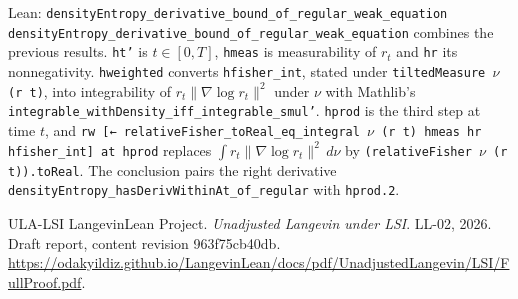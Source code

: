 \documentclass[11pt,a4paper]{article}
\begin{document}
\begin{leanbox}{Lean: \texttt{densityEntropy\_\allowbreak{}derivative\_\allowbreak{}bound\_\allowbreak{}of\_\allowbreak{}regular\_\allowbreak{}weak\_\allowbreak{}equation}}
\texttt{density\allowbreak{}Entropy\_\allowbreak{}derivative\_\allowbreak{}bound\_\allowbreak{}of\_\allowbreak{}regular\_\allowbreak{}weak\_\allowbreak{}equation} combines the previous results. \texttt{ht'} is \(t\in[0,T]\), \texttt{hmeas} is measurability of \(r_t\) and \texttt{hr} its nonnegativity. \texttt{hweighted} converts \texttt{hfisher\_\allowbreak{}int}, stated under \texttt{tilted\allowbreak{}Measure \ensuremath{\nu} (r t)}, into integrability of \(r_t\|\nabla\log r_t\|^2\) under \(\nu\) with Mathlib's \texttt{integrable\_\allowbreak{}with\allowbreak{}Density\_\allowbreak{}iff\_\allowbreak{}integrable\_\allowbreak{}smul'}. \texttt{hprod} is the third step at time \(t\), and \texttt{rw [← relative\allowbreak{}Fisher\_\allowbreak{}to\allowbreak{}Real\_\allowbreak{}eq\_\allowbreak{}integral \ensuremath{\nu} (r t) hmeas hr hfisher\_\allowbreak{}int] at hprod} replaces \(\int r_t\|\nabla\log r_t\|^2\,d\nu\) by \texttt{(relative\allowbreak{}Fisher \ensuremath{\nu} (r t)).\allowbreak{}to\allowbreak{}Real}. The conclusion pairs the right derivative \texttt{density\allowbreak{}Entropy\_\allowbreak{}has\allowbreak{}Deriv\allowbreak{}Within\allowbreak{}At\_\allowbreak{}of\_\allowbreak{}regular} with \texttt{hprod.\allowbreak{}2}.
\end{leanbox}

\begin{thebibliography}{ULA-LSI}
LangevinLean Project. \emph{Unadjusted Langevin under LSI}. LL-02, 2026. Draft report, content revision 963f75cb40db. \url{https://odakyildiz.github.io/LangevinLean/docs/pdf/UnadjustedLangevin/LSI/FullProof.pdf}.
\end{thebibliography}
\end{document}
